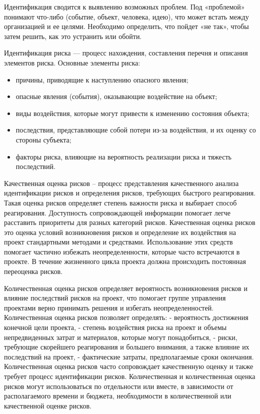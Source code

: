 Идентификация сводится к выявлению возможных проблем. 
Под «проблемой» понимают что-либо (событие, объект, человека, идею), что может встать между организацией и ее целями.
Необходимо определить, что пойдет «не так», чтобы затем решить, как это устранить или обойти.

Идентификация риска --- процесс нахождения, составления перечня и описания элементов риска.
Основные элементы риска:
\begin{itemize}
\item  причины, приводящие к наступлению опасного явления;
\item опасные явления (события), оказывающие воздействие на объект;
\item виды воздействия, которые могут привести к изменению состояния объекта;
\item последствия, представляющие собой потери из-за воздействия, и их оценку со стороны субъекта;
\item факторы риска, влияющие на вероятность реализации риска и тяжесть последствий.
\end{itemize}

Качественная оценка рисков – процесс представления качественного анализа
идентификации рисков и определения рисков, требующих быстрого реагирования. Такая
оценка рисков определяет степень важности риска и выбирает способ реагирования.
Доступность сопровождающей информации помогает легче расставить приоритеты для
разных категорий рисков. Качественная оценка рисков это оценка условий возникновения
рисков и определение их воздействия на проект стандартными методами и средствами.
Использование этих средств помогает частично избежать неопределенности, которые
часто встречаются в проекте. В течение жизненного цикла проекта должна происходить
постоянная переоценка рисков.

Количественная оценка рисков определяет вероятность возникновения рисков и
влияние последствий рисков на проект, что помогает группе управления проектами верно
принимать решения и избегать неопределенностей. Количественная оценка рисков
позволяет определять:
- вероятность достижения конечной цели проекта,
- степень воздействия риска на проект и объемы непредвиденных затрат и
материалов, которые могут понадобиться,
- риски, требующие скорейшего реагирования и большего внимания, а также
влияние их последствий на проект,
- фактические затраты, предполагаемые сроки окончания.
Количественная оценка рисков часто сопровождает качественную оценку и также
требует процесс идентификации рисков. Количественная и количественная оценка рисков
могут использоваться по отдельности или вместе, в зависимости от располагаемого
времени и бюджета, необходимости в количественной или качественной оценке рисков.

